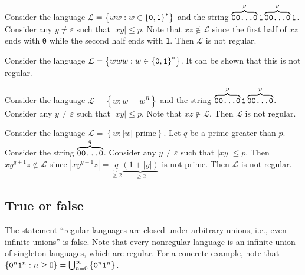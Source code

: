 \documentclass{notes}
\begin{document}
\begin{eg}
  Consider the language $\mathcal L = \left \{ ww : w \in \left \{ \verb~0~, \verb~1~ \right \}^* \right \}$ and the string $\overbrace{\verb~00...0~}^{p} \verb~1~ \overbrace{\verb~00...0~}^{p} \verb~1~$.
  Consider any $y \neq \varepsilon$ such that $\left | x y \right | \leq p$.
  Note that $x z \not \in \mathcal L$ since the first half of $x z$ ends with \verb~0~ while the second half ends with \verb~1~.
  Then $\mathcal L$ is not regular.
\end{eg}

\begin{eg}
  Consider the language $\mathcal L = \left \{ www : w \in \left \{ \verb~0~, \verb~1~ \right \}^* \right \}$.
  It can be shown that this is not regular.
\end{eg}

\newpage

\begin{eg}
  Consider the language $\mathcal L = \left \{ w : w = w^R \right \}$ and the string $\overbrace{\verb~00...0~}^{p} \verb~1~ \overbrace{\verb~00...0~}^{p}$.
  Consider any $y \neq \varepsilon$ such that $\left | x y \right | \leq p$.
  Note that $x z \not \in \mathcal L$.
  Then $\mathcal L$ is not regular.
\end{eg}

\begin{eg}
  Consider the language $\mathcal L = \left \{ w : \text{$\left | w \right |$ prime} \right \}$.
  Let $q$ be a prime greater than $p$.
  Consider the string $\overbrace{\verb~00...0~}^{q}$.
  Consider any $y \neq \varepsilon$ such that $\left | x y \right | \leq p$.
  Then $x y^{q + 1} z \not \in \mathcal L$ since $\left | x y^{q + 1} z \right | = \underbrace{q}_{\geq 2} \underbrace{(1 + \left | y \right |)}_{\geq 2}$ is not prime.
  Then $\mathcal L$ is not regular. 
\end{eg}

\subsection{True or false}

\begin{eg}
  The statement ``regular languages are closed under arbitrary unions, i.e., even infinite unions'' is false.
  Note that every nonregular language is an infinite union of singleton languages, which are regular.
  For a concrete example, note that $\left \{ \verb~0~^n \verb~1~^n : n \geq 0 \right \} = \bigcup_{n = 0}^\infty \left \{ \verb~0~^n \verb~1~^n \right \}$.
\end{eg}
\end{document}
